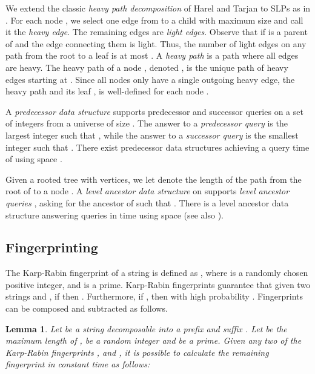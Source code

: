 \documentclass[11pt]{article}
\newtheorem{lemma}{Lemma}
\begin{document}
We extend the classic \emph{heavy path decomposition} of Harel and Tarjan \cite{HT1984} to SLPs as in \cite{bille2011random}. For each node , we select one edge from  to a child with maximum size and call it the \emph{heavy edge}. The remaining edges are \emph{light edges}. Observe that  if  is a parent of  and the edge connecting them is light. Thus, the number of light edges on any path from the root to a leaf is at most . 
A \emph{heavy path} is a path where all edges are heavy. The heavy path of a node , denoted , is the unique path of heavy edges starting at . Since all nodes only have a single outgoing heavy edge, the heavy path  and its leaf , is well-defined for each node .




A \emph{predecessor data structure} supports predecessor and successor queries on a set  of  integers from a universe  of size . The answer to a \emph{predecessor query}  is the largest integer  such that , while the answer to a \emph{successor query}  is the smallest integer  such that . There exist predecessor data structures achieving a query time of  using space  \cite{van1976design, mehlhorn1990bounded, willard1983log}.

Given a rooted tree  with  vertices, we let  denote the length of the path from the root of  to a node . A \emph{level ancestor data structure} on  supports \emph{level ancestor queries} , asking for the ancestor  of  such that . There is a level ancestor data structure answering queries in  time using  space \cite{dietz1991finding} (see also \cite{berkman1994finding, alstrup2000improved, bender2004level}).

\subsection{Fingerprinting}
The Karp-Rabin fingerprint \cite{karp1987efficient} of a string  is defined as , where  is a randomly chosen positive integer, and  is a prime. Karp-Rabin fingerprints guarantee that given two strings  and , if  then . Furthermore, if , then with high probability . Fingerprints can be composed and subtracted as follows.

\begin{lemma}\label{lem:fp}
Let  be a string decomposable into a prefix  and suffix . Let  be the maximum length of ,  be a random integer and  be a prime. Given any two of the Karp-Rabin fingerprints ,  and , it is possible to calculate the remaining fingerprint in constant time as follows:

\end{lemma}
\end{document}
